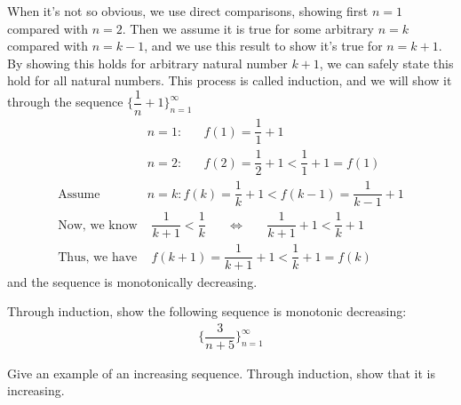 \begin{example}
When it's not so obvious, we use direct comparisons, showing first $n=1$ compared with $n=2$. Then we assume it is true for some arbitrary $n=k$ compared with $n=k-1$, and we use this result to show it's true for $n=k+1$. By showing this holds for arbitrary natural number $k+1$, we can safely state this hold for all natural numbers. This process is called induction, and we will show it through the sequence $\Big\{\dfrac{1}{n} + 1\Big\}_{n=1}^{\infty}$
\begin{align*}
    &n=1: \hspace{20pt} f(1) = \dfrac{1}{1} + 1\\[2ex]
    &n=2: \hspace{20pt} f(2) = \dfrac{1}{2} + 1 < \dfrac{1}{1} + 1 = f(1)\\[2ex]
    \text{Assume} \hspace{4pt} &n=k: f(k) = \dfrac{1}{k} + 1 < f(k-1) = \dfrac{1}{k-1} + 1\\[2ex]
    \text{Now, we know}& \hspace{4pt} \dfrac{1}{k+1} < \dfrac{1}{k} \hspace{20pt} \Longleftrightarrow \hspace{20pt} \dfrac{1}{k+1} + 1 < \dfrac{1}{k} + 1\\[2ex]
    \text{Thus, we have}& \hspace{4pt} f(k+1) = \dfrac{1}{k+1} + 1 < \dfrac{1}{k} + 1 = f(k)
\end{align*}
and the sequence is monotonically decreasing.
\end{example}

\begin{exercise}
Through induction, show the following sequence is monotonic decreasing:
\begin{align*}
    \Big\{\dfrac{3}{n+5}\Big\}_{n=1}^{\infty}
\end{align*}
\end{exercise}

\begin{exercise}
Give an example of an increasing sequence. Through induction, show that it is increasing.
\end{exercise}

